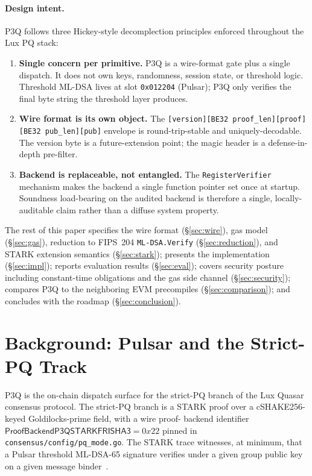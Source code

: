\documentclass[11pt,a4paper]{article}
\begin{document}
\paragraph{Design intent.} P3Q follows three Hickey-style
decomplection principles enforced throughout the Lux PQ stack:

\begin{enumerate}
\item \textbf{Single concern per primitive.} P3Q is a wire-format
gate plus a single dispatch. It does not own keys, randomness,
session state, or threshold logic. Threshold ML-DSA lives at slot
\texttt{0x012204} (Pulsar); P3Q only verifies the final byte string
the threshold layer produces.
\item \textbf{Wire format is its own object.} The
\texttt{[version][BE32 proof\_len][proof][BE32 pub\_len][pub]}
envelope is round-trip-stable and uniquely-decodable. The version
byte is a future-extension point; the magic header is a defense-in-
depth pre-filter.
\item \textbf{Backend is replaceable, not entangled.} The
\texttt{RegisterVerifier} mechanism makes the backend a single
function pointer set once at startup. Soundness load-bearing on the
audited backend is therefore a single, locally-auditable claim
rather than a diffuse system property.
\end{enumerate}

The rest of this paper specifies the wire format
(\S\ref{sec:wire}), gas model (\S\ref{sec:gas}), reduction to
FIPS~204 \texttt{ML-DSA.Verify} (\S\ref{sec:reduction}), and STARK
extension semantics (\S\ref{sec:stark}); presents the implementation
(\S\ref{sec:impl}); reports evaluation results (\S\ref{sec:eval});
covers security posture including constant-time obligations and the
gas side channel (\S\ref{sec:security}); compares P3Q to the
neighboring EVM precompiles (\S\ref{sec:comparison}); and concludes
with the roadmap (\S\ref{sec:conclusion}).

\section{Background: Pulsar and the Strict-PQ Track}\label{sec:bg}

P3Q is the on-chain dispatch surface for the strict-PQ branch of the
Lux Quasar consensus protocol. The strict-PQ branch is a STARK proof
over a cSHAKE256-keyed Goldilocks-prime field, with a wire proof-
backend identifier $\mathsf{ProofBackendP3QSTARKFRISHA3} = 0x22$
pinned in \texttt{consensus/config/pq\_mode.go}. The STARK trace
witnesses, at minimum, that a Pulsar threshold ML-DSA-65 signature
verifies under a given group public key on a given message
binder~\cite{pulsar}.
\end{document}
